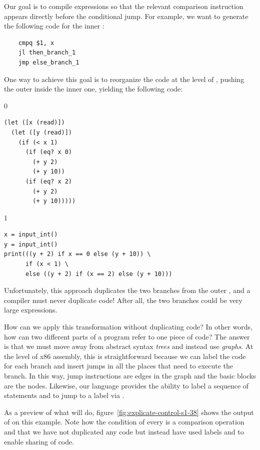 \documentclass[7x10]{TimesAPriori_MIT}%
\def\racketEd{0}
\def\pythonEd{1}
\def\edition{0}
\numberwithin{theorem}{chapter}
\numberwithin{definition}{chapter}
\numberwithin{equation}{chapter}
\begin{document}
Our goal is to compile  expressions so that the relevant
comparison instruction appears directly before the conditional jump.
For example, we want to generate the following code for the inner
:
\begin{center}
\begin{minipage}{0.96\textwidth}
\begin{lstlisting}
    cmpq $1, x
    jl then_branch_1
    jmp else_branch_1
\end{lstlisting}
\end{minipage}
\end{center}
One way to achieve this goal is to reorganize the code at the level of
\LangIf{}, pushing the outer  inside the inner one, yielding
the following code:
\begin{center}
\begin{minipage}{0.96\textwidth}
{\if\edition\racketEd        
\begin{lstlisting}
(let ([x (read)])
  (let ([y (read)])
    (if (< x 1) 
      (if (eq? x 0)
        (+ y 2)
        (+ y 10))
      (if (eq? x 2)
        (+ y 2)
        (+ y 10)))))
\end{lstlisting}
\fi}
{\if\edition\pythonEd
\begin{lstlisting}
x = input_int()
y = input_int()
print(((y + 2) if x == 0 else (y + 10)) \
      if (x < 1) \
      else ((y + 2) if (x == 2) else (y + 10)))
\end{lstlisting}
\fi}
\end{minipage}
\end{center}
Unfortunately, this approach duplicates the two branches from the
outer , and a compiler must never duplicate code!  After all,
the two branches could be very large expressions.

How can we apply this transformation without duplicating code? In
other words, how can two different parts of a program refer to one
piece of code?
%
The answer is that we must move away from abstract syntax \emph{trees}
and instead use \emph{graphs}.
%
At the level of x86 assembly, this is straightforward because we can
label the code for each branch and insert jumps in all the places that
need to execute the branch. In this way, jump instructions are edges
in the graph and the basic blocks are the nodes.
%
Likewise, our language \LangCIf{} provides the ability to label a
sequence of statements and to jump to a label via .

As a preview of what  will do,
figure~\ref{fig:explicate-control-s1-38} shows the output of
\code{explicate\_control} on this example. Note how the condition of
every \code{if} is a comparison operation and that we have not
duplicated any code but instead have used labels and \code{goto} to
enable sharing of code.
\end{document}
